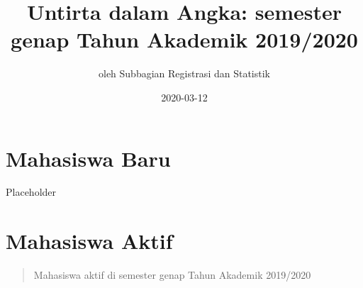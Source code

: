 \documentclass[
]{book}
\title{Untirta dalam Angka: semester genap Tahun Akademik 2019/2020}
\author{oleh Subbagian Registrasi dan Statistik}
\date{2020-03-12}
\begin{document}
\maketitle

{
\setcounter{tocdepth}{1}
\tableofcontents
}
\hypertarget{mahasiswa-baru}{%
\chapter{Mahasiswa Baru}\label{mahasiswa-baru}}

Placeholder

\hypertarget{mahasiswa-aktif}{%
\chapter{Mahasiswa Aktif}\label{mahasiswa-aktif}}

\begin{quote}
Mahasiswa aktif di semester genap Tahun Akademik 2019/2020
\end{quote}
\end{document}
